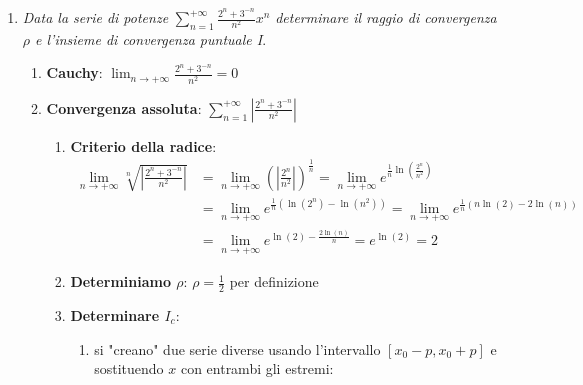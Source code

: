 \documentclass[10pt, a4paper]{article}
\begin{document}
\begin{enumerate}
\begin{enumerate}
            \end{enumerate}
            \item \textit{Data la serie di potenze} $\sum_{n=1}^{+\infty}\frac{2^n+3^{-n}}{n^2}x^n$ \textit{determinare il raggio di convergenza $\rho$ e l'insieme di convergenza puntuale I}. \begin{enumerate}
                \item \textbf{Cauchy}: $\lim_{n\rightarrow+\infty}\frac{2^n+3^{-n}}{n^2}=0$
                \item \textbf{Convergenza assoluta}: $\sum_{n=1}^{+\infty}\left|\frac{2^n+3^{-n}}{n^2}\right|$
                \begin{enumerate}
                    \item \textbf{Criterio della radice}: \begin{equation*}
                        \begin{split}
                            \lim_{n\rightarrow+\infty}\sqrt[n]{\left|\frac{2^n+3^{-n}}{n^2}\right|}&=\lim_{n\rightarrow+\infty}\left(\left|\frac{2^n}{n^2}\right|\right)^{\frac{1}{n}}=\lim_{n\rightarrow+\infty}e^{\frac{1}{n}\ln\left(\frac{2^n}{n^2}\right)}\\
                            &=\lim_{n\rightarrow+\infty}e^{\frac{1}{n}\left(\ln\left({2^n}\right)-\ln\left({n^2}\right)\right)}=\lim_{n\rightarrow+\infty}e^{\frac{1}{n}\left(n\ln\left({2}\right)-2\ln\left({n}\right)\right)}\\
                            &=\lim_{n\rightarrow+\infty}e^{\ln\left({2}\right)-\frac{2\ln\left({n}\right)}{n}}=e^{\ln(2)}=2
                        \end{split}
                    \end{equation*}
                    \item \textbf{Determiniamo $\rho$}: $\rho=\frac{1}{2}$ per definizione\\
                    \item \textbf{Determinare $I_c$}: \begin{enumerate}
                        \item si "creano" due serie diverse usando l'intervallo $\left[x_0-p,x_0+p\right]$ e sostituendo $x$ con entrambi gli estremi: \begin{equation*}
                            \begin{split}

\end{split}
\end{equation*}
\end{enumerate}
\end{enumerate}
\end{enumerate}
\end{enumerate}
\end{document}
